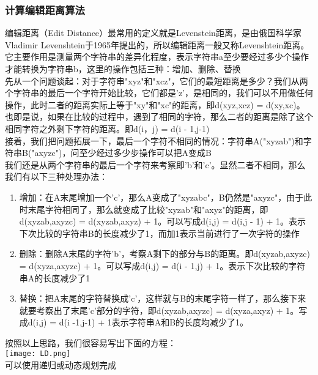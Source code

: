 \documentclass[UTF8]{ctexart}
\begin{document}
	\subsubsection{计算编辑距离算法}
	\qquad 编辑距离（Edit Distance）最常用的定义就是Levenstein距离，是由俄国科学家Vladimir Levenshtein于1965年提出的，所以编辑距离一般又称Levenshtein距离。它主要作用是测量两个字符串的差异化程度，表示字符串a至少要经过多少个操作才能转换为字符串b，这里的操作包括三种：增加、删除、替换 \\
	\qquad 先从一个问题谈起：对于字符串"xyz"和"xcz"，它们的最短距离是多少？我们从两个字符串的最后一个字符开始比较，它们都是'z'，是相同的，我们可以不用做任何操作，此时二者的距离实际上等于"xy"和"xc"的距离，即d(xyz,xcz) = d(xy,xc)。也即是说，如果在比较的过程中，遇到了相同的字符，那么二者的距离是除了这个相同字符之外剩下字符的距离。即d(i，j) = d(i - 1,j-1) \\
	\qquad 接着，我们把问题拓展一下，最后一个字符不相同的情况：字符串A("xyzab")和字符串B("axyzc")，问至少经过多少步操作可以把A变成B \\
	\qquad 我们还是从两个字符串的最后一个字符来考察即'b'和'c'。显然二者不相同，那么我们有以下三种处理办法：
	\begin{enumerate}[label=(\arabic*),leftmargin=3em]
		\item 增加：在A末尾增加一个'c'，那么A变成了"xyzabc"，B仍然是"axyzc"，由于此时末尾字符相同了，那么就变成了比较"xyzab"和"axyz"的距离，即d(xyzab,axyzc) = d(xyzab,axyz) + 1。可以写成d(i,j) = d(i,j - 1) + 1。表示下次比较的字符串B的长度减少了1，而加1表示当前进行了一次字符的操作
		\item 删除：删除A末尾的字符'b'，考察A剩下的部分与B的距离。即d(xyzab,axyzc) = d(xyza,axyzc) + 1。可以写成d(i,j) = d(i - 1,j) + 1。表示下次比较的字符串A的长度减少了1
		\item 替换：把A末尾的字符替换成'c'，这样就与B的末尾字符一样了，那么接下来就要考察出了末尾'c'部分的字符，即d(xyzab,axyzc) = d(xyza,axyz) + 1。写成d(i,j) = d(i -1,j-1) + 1表示字符串A和B的长度均减少了1。
	\end{enumerate}
	\qquad 按照以上思路，我们很容易写出下面的方程：\\
	\texttt{[image: LD.png]} \\
	\qquad 可以使用递归或动态规划完成
\end{document}
